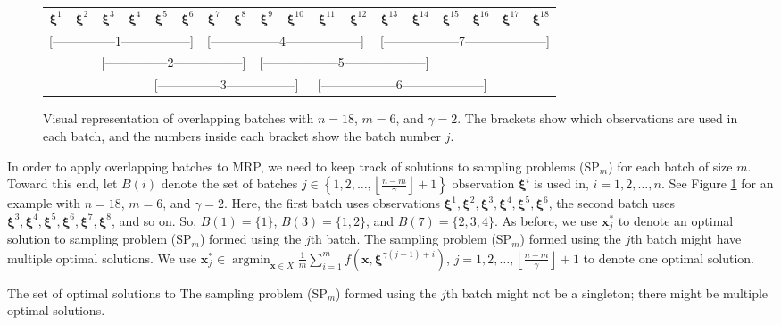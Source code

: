 \documentclass[12pt]{article}
\newcommand{\x}{\mathbf{x}}
\newcommand{\xs}{\x^*}
\newcommand{\xit}{\boldsymbol{\xi}}
\newcommand{\xiti}{\xit^i}
\newcommand{\nb}{\left\lfloor\tfrac{n-m}{\gamma}\right\rfloor+1}
\DeclareMathOperator*{\argmin}{argmin}
\begin{document}
\begin{figure}[tb!]
	\centering
	\begin{tabular}{*{18}{c}}
		$\xit^1$ & $\xit^2$ & $\xit^3$ & $\xit^4$ & $\xit^5$ & $\xit^6$ & $\xit^7$ & $\xit^8$ & $\xit^9$ & $\xit^{10}$ & $\xit^{11}$ & $\xit^{12}$ & $\xit^{13}$ & $\xit^{14}$ & $\xit^{15}$ & $\xit^{16}$ & $\xit^{17}$  & $\xit^{18}$ \\
		\multicolumn{6}{l}{[---------------1-----------------]} &
		\multicolumn{6}{l}{[-----------------4------------------]} &
		\multicolumn{6}{l}{[------------------7--------------------]} \\
		& & \multicolumn{6}{l}{[---------------2-----------------]} &
		\multicolumn{6}{l}{[------------------5--------------------]} \\
		& & & & \multicolumn{6}{l}{[---------------3-----------------]} &
		\multicolumn{6}{l}{[------------------6--------------------]} \\
	\end{tabular}
	\caption{Visual representation of overlapping batches with $n = 18$, $m = 6$, and $\gamma = 2$.  
        The brackets show which observations are used in each batch, and the numbers inside each bracket show the batch number $j$.}
	\label{fig:overlap_nonint}
\end{figure}

In order to apply overlapping batches to MRP, we need to keep track of solutions to sampling problems (SP$_m$) for each batch of size $m$.  
Toward this end, let $B(i)$ denote the set of batches $j \in \left\{1, 2, \dots, \nb \right\}$ observation $\xiti$ is used in, $i = 1, 2, \dots, n$.  
See Figure \ref{fig:overlap_nonint} for an example with $n=18$, $m = 6$, and $\gamma = 2$.  
Here, the first batch uses observations $\xit^1, \xit^2, \xit^3, \xit^4, \xit^5, \xit^6$, the second batch uses $\xit^3, \xit^4, \xit^5, \xit^6, \xit^7, \xit^8$, and so on.  
So, $B(1) = \{1\}$, $B(3) = \{1,2\}$, and $B(7)=\{2,3,4\}$.  
As before, we use $\xs_j$ to denote an optimal solution to sampling problem (SP$_m$) formed using the $j$th batch. 
The sampling problem (SP$_m$) formed using the $j$th batch might have multiple optimal solutions. 
We use $\xs_j \in \argmin_{\x \in X} \frac{1}{m} \sum_{i=1}^m f(\x,\xit^{\gamma(j-1) + i})$, $j = 1, 2, \dots, \nb$ to denote one optimal solution. 

The set of optimal solutions to The sampling problem (SP$_m$) formed using the $j$th batch might not be a singleton; there might be multiple optimal solutions. 
\end{document}
